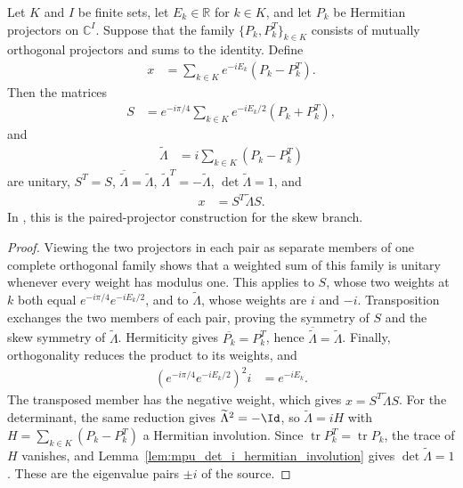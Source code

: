 \begin{lemma}
    \label{lem:mpu_skew_unitary_paired_projectors}
    \leanok
    Let $K$ and $I$ be finite sets, let $E_k\in\mathbb R$ for $k\in K$, and
    let $P_k$ be Hermitian projectors on $\mathbb C^I$. Suppose that the family
    $\{P_k,P_k^T\}_{k\in K}$ consists of mutually orthogonal projectors and
    sums to the identity. Define
    \begin{align}
        x & = \sum_{k\in K} e^{-iE_k}(P_k-P_k^T).
    \end{align}
    Then the matrices
    \begin{align}
        S & = e^{-i\pi/4}\sum_{k\in K} e^{-iE_k/2}(P_k+P_k^T),
    \end{align}
    and
    \begin{align}
        \widetilde\Lambda & = i\sum_{k\in K}(P_k-P_k^T)
    \end{align}
    are unitary, $S^T=S$, $\overline{\widetilde\Lambda}=\widetilde\Lambda$,
    $\widetilde\Lambda^T=-\widetilde\Lambda$, $\det\widetilde\Lambda=1$, and
    \begin{align}
        x & = S^T\widetilde\Lambda S.
    \end{align}
    In \cite[Lemma~\texttt{lemma:conjclass-normalform-continuous}]{Cirac2017MPU}, this is the paired-projector construction for the skew
    branch.
\end{lemma}

\begin{proof}\leanok
    Viewing the two projectors in each pair as separate members of one complete
    orthogonal family shows that a weighted sum of this family is unitary whenever every
    weight has modulus one. This applies to $S$, whose two weights at $k$
    both equal $e^{-i\pi/4}e^{-iE_k/2}$, and to
    $\widetilde\Lambda$, whose weights are $i$ and $-i$.
    Transposition exchanges the two members of each pair, proving the symmetry
    of $S$ and the skew symmetry of $\widetilde\Lambda$. Hermiticity gives
    $\overline{P_k}=P_k^T$, hence
    $\overline{\widetilde\Lambda}=\widetilde\Lambda$. Finally, orthogonality
    reduces the product to its weights, and
    \begin{align}
        \left(e^{-i\pi/4}e^{-iE_k/2}\right)^2 i & = e^{-iE_k}.
    \end{align}
    The transposed member has the negative weight, which gives
    $x=S^T\widetilde\Lambda S$. For the determinant, the same reduction gives
    $\widetilde\Lambda^2=-\Id$, so $\widetilde\Lambda=iH$ with
    $H=\sum_{k\in K}(P_k-P_k^T)$ a Hermitian involution. Since
    $\operatorname{tr}P_k^T=\operatorname{tr}P_k$, the trace of $H$ vanishes,
    and Lemma~\ref{lem:mpu_det_i_hermitian_involution} gives
    $\det\widetilde\Lambda=1$. These are the eigenvalue pairs $\pm i$ of the
    source.
\end{proof}

